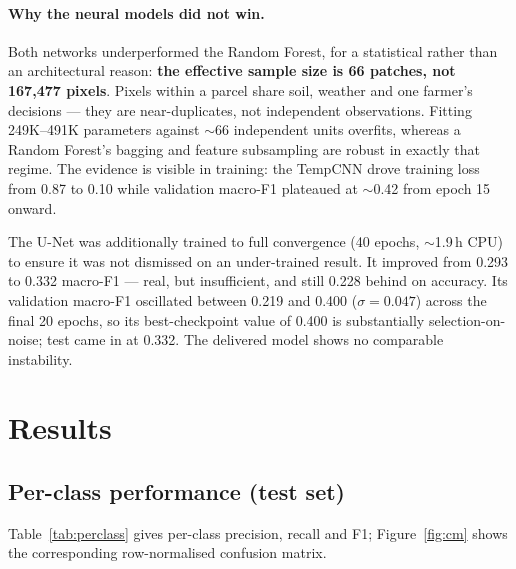 \documentclass[11pt,a4paper]{article}
\begin{document}
\paragraph{Why the neural models did not win.}
Both networks underperformed the Random Forest, for a statistical rather than an
architectural reason: \textbf{the effective sample size is 66 patches, not
167{,}477 pixels}. Pixels within a parcel share soil, weather and one farmer's
decisions --- they are near-duplicates, not independent observations. Fitting
249K--491K parameters against $\sim$66 independent units overfits, whereas a
Random Forest's bagging and feature subsampling are robust in exactly that
regime. The evidence is visible in training: the TempCNN drove training loss
from 0.87 to 0.10 while validation macro-F1 plateaued at $\sim$0.42 from epoch
15 onward.

The U-Net was additionally trained to full convergence (40 epochs, $\sim$1.9\,h
CPU) to ensure it was not dismissed on an under-trained result. It improved from
0.293 to 0.332 macro-F1 --- real, but insufficient, and still 0.228 behind on
accuracy. Its validation macro-F1 oscillated between 0.219 and 0.400
($\sigma = 0.047$) across the final 20 epochs, so its best-checkpoint value of
0.400 is substantially selection-on-noise; test came in at 0.332. The delivered
model shows no comparable instability.

\section{Results}\label{sec:results}

\subsection{Per-class performance (test set)}\label{sec:perclass}

Table~\ref{tab:perclass} gives per-class precision, recall and F1;
Figure~\ref{fig:cm} shows the corresponding row-normalised confusion matrix.
\end{document}
